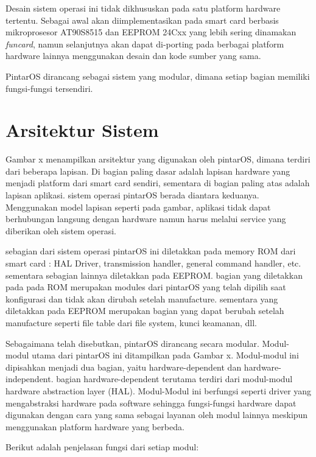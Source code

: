 \documentclass[a4paper, 12pt]{report}
\begin{document}
Desain sistem operasi ini tidak dikhususkan pada satu platform hardware tertentu. Sebagai awal akan diimplementasikan pada smart card berbasis mikroprosesor AT90S8515 dan EEPROM 24Cxx yang lebih sering dinamakan \emph{funcard}, namun selanjutnya akan dapat di-porting pada berbagai platform hardware lainnya menggunakan desain dan kode sumber yang sama.

PintarOS dirancang sebagai sistem yang modular, dimana setiap bagian memiliki fungsi-fungsi tersendiri.

\section{Arsitektur Sistem}
\label{pintaros-arsitektur}

Gambar x menampilkan arsitektur yang digunakan oleh pintarOS, dimana terdiri dari beberapa lapisan. Di bagian paling dasar adalah lapisan hardware yang menjadi platform dari smart card sendiri, sementara di bagian paling atas adalah lapisan aplikasi. sistem operasi pintarOS berada diantara keduanya. Menggunakan model lapisan seperti pada gambar, aplikasi tidak dapat berhubungan langsung dengan hardware namun harus melalui service yang diberikan oleh sistem operasi.

sebagian dari sistem operasi pintarOS ini diletakkan pada memory ROM dari smart card : HAL Driver, transmission handler, general command handler, etc. sementara sebagian lainnya diletakkan pada EEPROM. bagian yang diletakkan pada pada ROM merupakan modules dari pintarOS yang telah dipilih saat konfigurasi dan tidak akan dirubah setelah manufacture. sementara yang diletakkan pada EEPROM merupakan bagian yang dapat berubah setelah manufacture seperti file table dari file system, kunci keamanan, dll.

Sebagaimana telah disebutkan, pintarOS dirancang secara modular. Modul-modul utama dari pintarOS ini ditampilkan pada Gambar x. Modul-modul ini dipisahkan menjadi dua bagian, yaitu hardware-dependent dan hardware-independent. bagian hardware-dependent terutama terdiri dari modul-modul hardware abstraction layer (HAL). Modul-Modul ini berfungsi seperti driver yang mengabstraksi hardware pada software sehingga fungsi-fungsi hardware dapat digunakan dengan cara yang sama sebagai layanan oleh modul lainnya meskipun menggunakan platform hardware yang berbeda.

Berikut adalah penjelasan fungsi dari setiap modul:
\end{document}
